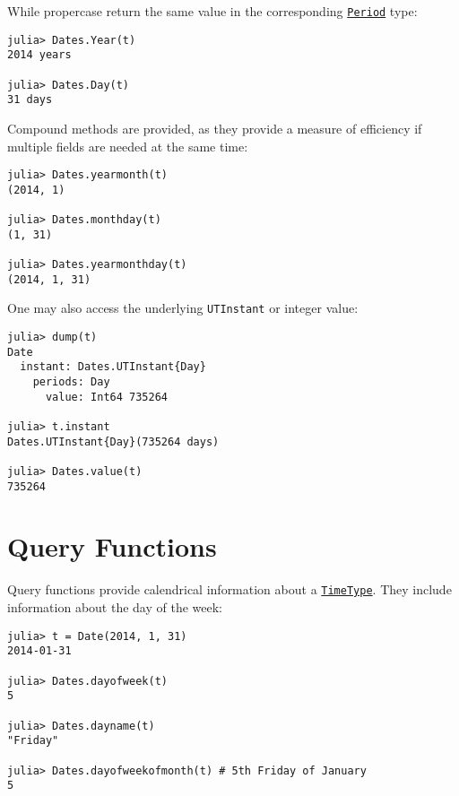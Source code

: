 While propercase return the same value in the corresponding \hyperlink{17624028548543163266}{\texttt{Period}} type:




\begin{verbatim}
julia> Dates.Year(t)
2014 years

julia> Dates.Day(t)
31 days
\end{verbatim}



Compound methods are provided, as they provide a measure of efficiency if multiple fields are needed at the same time:




\begin{verbatim}
julia> Dates.yearmonth(t)
(2014, 1)

julia> Dates.monthday(t)
(1, 31)

julia> Dates.yearmonthday(t)
(2014, 1, 31)
\end{verbatim}



One may also access the underlying \texttt{UTInstant} or integer value:




\begin{verbatim}
julia> dump(t)
Date
  instant: Dates.UTInstant{Day}
    periods: Day
      value: Int64 735264

julia> t.instant
Dates.UTInstant{Day}(735264 days)

julia> Dates.value(t)
735264
\end{verbatim}



\hypertarget{16158364891045757229}{}


\section{Query Functions}



Query functions provide calendrical information about a \hyperlink{4438614350756187528}{\texttt{TimeType}}. They include information about the day of the week:




\begin{verbatim}
julia> t = Date(2014, 1, 31)
2014-01-31

julia> Dates.dayofweek(t)
5

julia> Dates.dayname(t)
"Friday"

julia> Dates.dayofweekofmonth(t) # 5th Friday of January
5
\end{verbatim}



